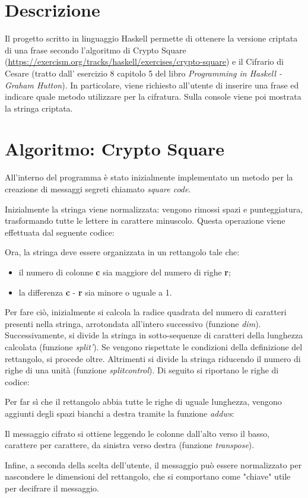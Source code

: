 \section{Descrizione}
Il progetto scritto in linguaggio Haskell permette di ottenere la versione criptata di una frase secondo l'algoritmo di Crypto Square (\url{https://exercism.org/tracks/haskell/exercises/crypto-square}) e il Cifrario di Cesare (tratto dall' esercizio 8 capitolo 5 del libro \textit{Programming in Haskell - Graham Hutton}). In particolare, viene richiesto all'utente di inserire una frase ed indicare quale metodo utilizzare per la cifratura. Sulla console viene poi mostrata la stringa criptata.

\section{Algoritmo: Crypto Square}
All'interno del programma è stato inizialmente implementato un metodo per la creazione di messaggi segreti chiamato \textit{square code}. 

Inizialmente la stringa viene normalizzata: vengono rimossi spazi e punteggiatura, trasformando tutte le lettere in carattere minuscolo. Questa operazione viene effettuata dal seguente codice:

Ora, la stringa deve essere organizzata in un rettangolo tale che:
\begin{itemize}
	\item il numero di colonne \textbf{c} sia maggiore del numero di righe \textbf{r};
	\item la differenza \textbf{c} - \textbf{r} sia minore o uguale a 1. 
\end{itemize}
Per fare ciò, inizialmente si calcola la radice quadrata del numero di caratteri presenti nella stringa, arrotondata all'intero successivo (funzione \textit{dim}). Successivamente, si divide la stringa in sotto-sequenze di caratteri della lunghezza calcolata (funzione \textit{split'}). Se vengono rispettate le condizioni della definizione del rettangolo, si procede oltre. Altrimenti si divide la stringa riducendo il numero di righe di una unità (funzione \textit{splitcontrol}). Di seguito si riportano le righe di codice:

Per far sì che il rettangolo abbia tutte le righe di uguale lunghezza, vengono aggiunti degli spazi bianchi a destra tramite la funzione \textit{addws}:

Il messaggio cifrato si ottiene leggendo le colonne dall'alto verso il basso, carattere per carattere, da sinistra verso destra (funzione \textit{transpose}).

Infine, a seconda della scelta dell'utente, il messaggio può essere normalizzato per nascondere le dimensioni del rettangolo, che si comportano come "chiave" utile per decifrare il messaggio.

